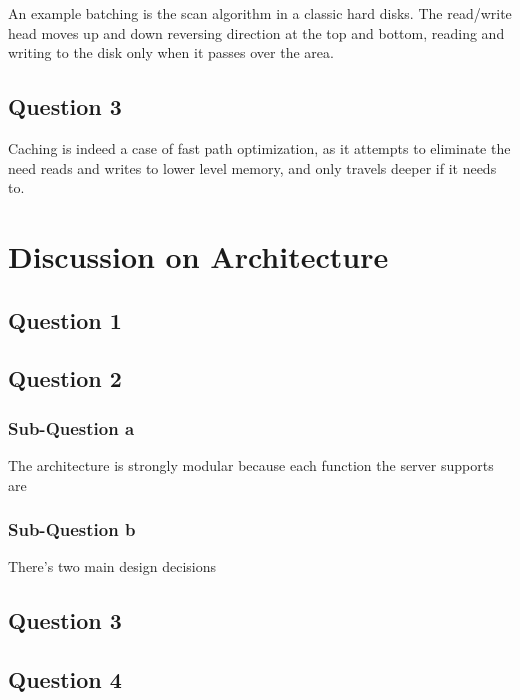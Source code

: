 \documentclass[10pt,a4paper]{article}
\begin{document}
An example batching is the scan algorithm in a classic hard disks. The read/write head moves up and down reversing direction at the top and bottom, reading and writing to the disk only when it passes over the area.

\subsection{Question 3}

Caching is indeed a case of fast path optimization, as it attempts to eliminate the need reads and writes to lower level memory, and only travels deeper if it needs to.


\section{Discussion on Architecture}

\subsection{Question 1}

\subsection{Question 2}

\subsubsection{Sub-Question a}

The architecture is strongly modular because each function the server supports are

\subsubsection{Sub-Question b}

There's two main design decisions

\subsection{Question 3}

\subsection{Question 4}
\end{document}
